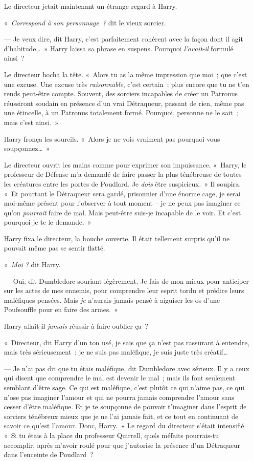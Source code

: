 Le directeur jetait maintenant un étrange regard à Harry.

«~\emph{Correspond à son personnage~?} dit le vieux sorcier.

--- Je veux dire, dit Harry, c'est parfaitement cohérent avec la façon dont il agit d'habitude…~»
Harry laissa sa phrase en suspens.
Pourquoi \emph{l'avait-il} formulé ainsi~?

Le directeur hocha la tête.
«~Alors tu as la même impression que moi~; que c'est une excuse.
Une excuse très \emph{raisonnable}, c'est certain~; plus encore que tu ne t'en rends peut-être compte.
Souvent, des sorciers incapables de créer un Patronus réussiront soudain en présence d'un vrai Détraqueur, passant de rien, même pas une étincelle, à un Patronus totalement formé.
Pourquoi, personne ne le sait~; mais c'est ainsi.~»

Harry fronça les sourcils.
«~Alors je ne vois vraiment pas pourquoi vous soupçonnez…~»

Le directeur ouvrit les mains comme pour exprimer son impuissance.
«~Harry, le professeur de Défense m'a demandé de faire passer la plus ténébreuse de toutes les créatures entre les portes de Poudlard.
Je \emph{dois} être suspicieux.~»
Il soupira.
«~Et pourtant le Détraqueur sera gardé, prisonnier d'une énorme cage, je serai moi-même présent pour l'observer à tout moment -- je ne peux pas imaginer ce qu'on \emph{pourrait} faire de mal.
Mais peut-être suis-je incapable de le voir.
Et c'est pourquoi je te le demande.~»

Harry fixa le directeur, la bouche ouverte.
Il était tellement surpris qu'il ne pouvait même pas se sentir flatté.

«~\emph{Moi} \emph{?} dit Harry.

--- Oui, dit Dumbledore souriant légèrement.
Je fais de mon mieux pour anticiper sur les actes de mes ennemis, pour comprendre leur esprit tordu et prédire leurs maléfiques pensées.
Mais \emph{je} n'aurais jamais pensé à aiguiser les os d'une Poufsouffle pour en faire des armes.~»

Harry allait-il \emph{jamais} réussir à faire oublier ça~?

«~Directeur, dit Harry d'un ton usé, je sais que ça n'est pas rassurant à entendre, mais très sérieusement~: je ne suis pas maléfique, je suis juste très créatif…

--- Je n'ai pas dit que tu étais maléfique, dit Dumbledore avec sérieux.
Il y a ceux qui disent que comprendre le mal est devenir le mal~; mais ils font seulement semblant d'être sage.
Ce qui est maléfique, c'est plutôt ce qui n'aime pas, ce qui n'ose pas imaginer l'amour et qui ne pourra jamais comprendre l'amour sans cesser d'être maléfique.
Et je te soupçonne de pouvoir t'imaginer dans l'esprit de sorciers ténébreux mieux que je ne l'ai jamais fait, et ce tout en continuant de savoir ce qu'est l'amour.
Donc, Harry.~»
Le regard du directeur s'était intensifié.
«~Si tu étais à la place du professeur Quirrell, quels méfaits pourrais-tu accomplir, après m'avoir roulé pour que j'autorise la présence d'un Détraqueur dans l'enceinte de Poudlard~?

